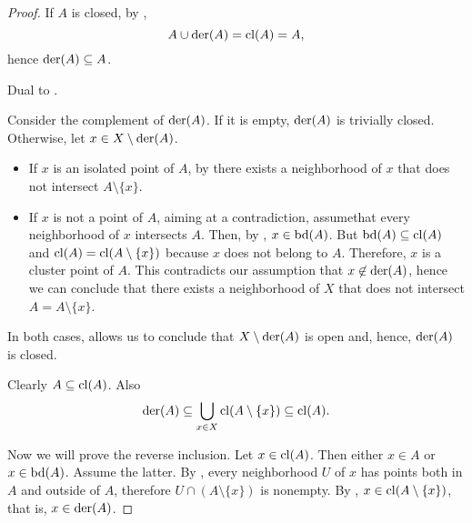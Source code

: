 \begin{proof}
  If \( A \) is closed, by ,
  \begin{equation*}
    A \cup \operatorname{der}(A) = \operatorname{cl}(A) = A,
  \end{equation*}
  hence \( \operatorname{der}(A) \subseteq A \).

   Dual to .

   Consider the complement of \( \operatorname{der}(A) \). If it is empty, \( \operatorname{der}(A) \) is trivially closed. Otherwise, let \( x \in X \setminus \operatorname{der}(A) \).

  \begin{itemize}
    \item If \( x \) is an isolated point of \( A \), by  there exists a neighborhood of \( x \) that does not intersect \( A \setminus \{ x \} \).
    \item If \( x \) is not a point of \( A \), aiming at a contradiction, assume\LEM that every neighborhood of \( x \) intersects \( A \). Then, by , \( x \in \operatorname{bd}(A) \). But \( \operatorname{bd}(A) \subseteq \operatorname{cl}(A) \) and \( \operatorname{cl}(A) = \operatorname{cl}(A \setminus \{ x \}) \) because \( x \) does not belong to \( A \). Therefore, \( x \) is a cluster point of \( A \). This contradicts our assumption that \( x \not\in \operatorname{der}(A) \), hence we can conclude that there exists a neighborhood of \( X \) that does not intersect \( A = A \setminus \{ x \} \).
  \end{itemize}

  In both cases,  allows us to conclude that \( X \setminus \operatorname{der}(A) \) is open and, hence, \( \operatorname{der}(A) \) is closed.

   Clearly \( A \subseteq \operatorname{cl}(A) \). Also
  \begin{equation*}
    \operatorname{der}(A) \subseteq \bigcup_{x \in X} \operatorname{cl}(A \setminus \{ x \}) \subseteq \operatorname{cl}(A).
  \end{equation*}

  Now we will prove the reverse inclusion. Let \( x \in \operatorname{cl}(A) \). Then either \( x \in A \) or \( x \in \operatorname{bd}(A) \). Assume the latter. By , every neighborhood \( U \) of \( x \) has points both in \( A \) and outside of \( A \), therefore \( U \cap (A \setminus \{ x \}) \) is nonempty. By , \( x \in \operatorname{cl}(A \setminus \{ x \}) \), that is, \( x \in \operatorname{der}(A) \).


\end{proof}
